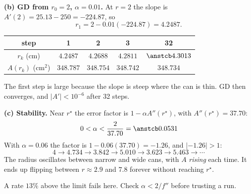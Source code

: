 \begin{frame}{}
  \textbf{(b) GD from $r_0 = 2$, $\alpha = 0.01$.} At $r = 2$ the slope is $A'(2) = 25.13 - 250 = -224.87$, so
  \[
    r_1 = 2 - 0.01(-224.87) = 4.2487 .
  \]
  \begin{center}\small
  \begin{tabular}{@{}c c c c c@{}}
    \toprule
    step & 1 & 2 & 3 & 32 \\
    \midrule
    $r_k$ (cm) & $4.2487$ & $4.2688$ & $4.2811$ & $\ans{4.3013}$ \\
    $A(r_k)$ (cm$^2$) & $348.787$ & $348.754$ & $348.742$ & $348.734$ \\
    \bottomrule
  \end{tabular}
  \end{center}
  The first step is large because the slope is steep where the can is thin. GD then converges, and $|A'| < 10^{-6}$
  after \alert{32} steps.
\end{frame}

\begin{frame}{}
  \textbf{(c) Stability.} Near $r^\star$ the error factor is $1 - \alpha A''(r^\star)$, with $A''(r^\star) = 37.70$:
  \[
    0 < \alpha < \frac{2}{37.70} = \ans{0.0531}
  \]
  With $\alpha = 0.06$ the factor is $1 - 0.06(37.70) = -1.26$, and $|{-1.26}| > 1$:
  \[
    4 \to 4.734 \to 3.842 \to 5.010 \to 3.623 \to 5.463 \to \cdots
  \]
  The radius oscillates between narrow and wide cans, with $A$ \emph{rising} each time. It ends up flipping between
  $r \approx 2.9$ and $7.8$ forever without reaching $r^\star$.
  \begin{warnbox}
    A rate $13\%$ above the limit fails here. Check $\alpha < 2/f''$ before trusting a run.
  \end{warnbox}
\end{frame}
